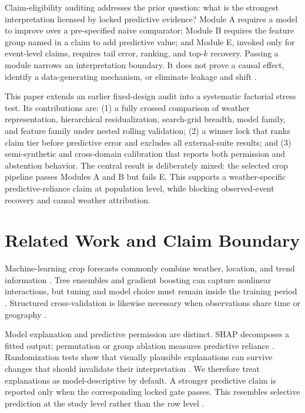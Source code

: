 \documentclass[conference]{IEEEtran}
\begin{document}
Claim-eligibility auditing addresses the prior question: what is the strongest
interpretation licensed by locked predictive evidence? Module A requires a
model to improve over a pre-specified naive comparator; Module B requires the
feature group named in a claim to add predictive value; and Module E, invoked
only for event-level claims, requires tail error, ranking, and top-$k$ recovery.
Passing a module narrows an interpretation boundary. It does not prove a causal
effect, identify a data-generating mechanism, or eliminate leakage and shift
\cite{Janzing2020,KapoorNarayanan2023}.

This paper extends an earlier fixed-design audit into a systematic factorial
stress test. Its contributions are: (1) a fully crossed comparison of weather
representation, hierarchical residualization, search-grid breadth, model
family, and feature family under nested rolling validation; (2) a winner lock
that ranks claim tier before predictive error and excludes all external-suite
results; and (3) semi-synthetic and cross-domain calibration that reports both
permission and abstention behavior. The central result is deliberately mixed:
the selected crop pipeline passes Modules A and B but fails E. This supports a
weather-specific predictive-reliance claim at population level, while blocking
observed-event recovery and causal weather attribution.

\section{Related Work and Claim Boundary}
Machine-learning crop forecasts commonly combine weather, location, and trend
information \cite{Paudel2021,Lu2017}. Tree ensembles and gradient boosting can
capture nonlinear interactions, but tuning and model choice must remain inside
the training period \cite{Breiman2001,Geurts2006,Ke2017,Prokhorenkova2018}.
Structured cross-validation is likewise necessary when observations share time
or geography \cite{Roberts2017}.

Model explanation and predictive permission are distinct. SHAP decomposes a
fitted output; permutation or group ablation measures predictive reliance
\cite{LundbergLee2017,Fisher2019}. Randomization tests show that visually
plausible explanations can survive changes that should invalidate their
interpretation \cite{Adebayo2018}. We therefore treat explanations as
model-descriptive by default. A stronger predictive claim is reported only
when the corresponding locked gate passes. This resembles selective prediction
at the study level rather than the row level \cite{ElYanivWiener2010}.
\end{document}
